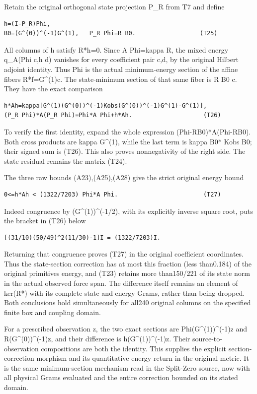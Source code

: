\documentclass[11pt,a4paper]{article}
\renewcommand{\[}{\begingroup\small\originaldisplaystart}
\renewcommand{\]}{\originaldisplayend\endgroup}
\begin{document}
Retain the original orthogonal state projection P\_R from T7 and define

\begin{verbatim}
h=(I-P_R)Phi,
B0=(G^(0))^(-1)G^(1),   P_R Phi=R B0.                  (T25)
\end{verbatim}

All columns of h satisfy R*h=0. Since A Phi=kappa R, the mixed energy
q\_A(Phi c,h d) vanishes for every coefficient pair c,d, by the original
Hilbert adjoint identity. Thus Phi is the actual minimum-energy section
of the affine fibers R*f=G\^{}(1)c. The state-minimum section of that
same fiber is R B0 c. They have the exact comparison

\begin{verbatim}
h*Ah=kappa[G^(1)(G^(0))^(-1)Kobs(G^(0))^(-1)G^(1)-G^(1)],
(P_R Phi)*A(P_R Phi)=Phi*A Phi+h*Ah.                    (T26)
\end{verbatim}

To verify the first identity, expand the whole expression
(Phi-RB0)*A(Phi-RB0). Both cross products are kappa G\^{}(1), while the
last term is kappa B0* Kobs B0; their signed sum is (T26). This also
proves nonnegativity of the right side. The state residual remains the
matrix (T24).

The three raw bounds (A23),(A25),(A28) give the strict original energy
bound

\begin{verbatim}
0<=h*Ah < (1322/7203) Phi*A Phi.                        (T27)
\end{verbatim}

Indeed congruence by (G\^{}(1))\^{}(-1/2), with its explicitly inverse
square root, puts the bracket in (T26) below

\begin{verbatim}
[(31/10)(50/49)^2(11/30)-1]I = (1322/7203)I.
\end{verbatim}

Returning that congruence proves (T27) in the original coefficient
coordinates. Thus the state-section correction has at most this fraction
(less than0.184) of the original primitive\textquotesingle s energy, and
(T23) retains more than150/221 of its state norm in the actual observed
force span. The difference itself remains an element of ker(R*) with its
complete state and energy Grams, rather than being dropped. Both
conclusions hold simultaneously for all240 original columns on the
specified finite box and coupling domain.

For a prescribed observation z, the two exact sections are
Phi(G\^{}(1))\^{}(-1)z and R(G\^{}(0))\^{}(-1)z, and their difference is
h(G\^{}(1))\^{}(-1)z. Their source-to-observation compositions are both
the identity. This supplies the explicit section-correction morphism and
its quantitative energy return in the original metric. It is the same
minimum-section mechanism read in the Split-Zero source, now with all
physical Grams evaluated and the entire correction bounded on its stated
domain.
\end{document}

